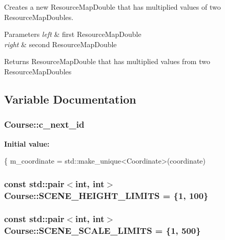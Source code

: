 Creates a new Resource\-Map\-Double that has multiplied values of two Resource\-Map\-Doubles. 


\begin{DoxyParams}{Parameters}
{\em left} & first Resource\-Map\-Double \\
\hline
{\em right} & second Resource\-Map\-Double \\
\hline
\end{DoxyParams}
\begin{DoxyReturn}{Returns}
Resource\-Map\-Double that has multiplied values from two Resource\-Map\-Doubles 
\end{DoxyReturn}


\subsection{Variable Documentation}
\hypertarget{namespaceCourse_ac8daa99f674ebf07facd81c13a1b84b6}{
\subsubsection[{c\-\_\-next\-\_\-id}]{\setlength{\rightskip}{0pt plus 5cm}Course\-::c\-\_\-next\-\_\-id}}\label{namespaceCourse_ac8daa99f674ebf07facd81c13a1b84b6}
{\bfseries Initial value\-:}
\begin{DoxyCode}
\{
    m\_coordinate = std::make\_unique<Coordinate>(coordinate)
\end{DoxyCode}
\hypertarget{namespaceCourse_af3db542553add269c70449ef3db28ea3}{
\subsubsection[{S\-C\-E\-N\-E\-\_\-\-H\-E\-I\-G\-H\-T\-\_\-\-L\-I\-M\-I\-T\-S}]{\setlength{\rightskip}{0pt plus 5cm}const std\-::pair$<$int, int$>$ Course\-::\-S\-C\-E\-N\-E\-\_\-\-H\-E\-I\-G\-H\-T\-\_\-\-L\-I\-M\-I\-T\-S = \{1, 100\}}}\label{namespaceCourse_af3db542553add269c70449ef3db28ea3}
\hypertarget{namespaceCourse_a5f86688257b627d010ece8d242b9ff9c}{
\subsubsection[{S\-C\-E\-N\-E\-\_\-\-S\-C\-A\-L\-E\-\_\-\-L\-I\-M\-I\-T\-S}]{\setlength{\rightskip}{0pt plus 5cm}const std\-::pair$<$int, int$>$ Course\-::\-S\-C\-E\-N\-E\-\_\-\-S\-C\-A\-L\-E\-\_\-\-L\-I\-M\-I\-T\-S = \{1, 500\}}}\label{namespaceCourse_a5f86688257b627d010ece8d242b9ff9c}
